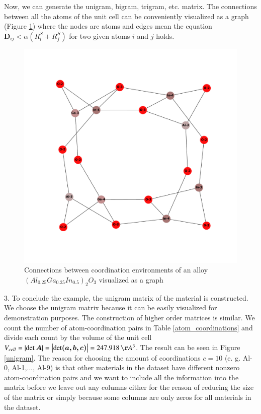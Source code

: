 \documentclass[11pt,oneside,czech,american]{book} %
\theoremstyle{plain}
\theoremstyle{definition}
\begin{document}
Now, we can generate the unigram, bigram, trigram, etc. matrix. The connections between all the atoms of the unit cell can be conveniently visualized as a graph (Figure \ref{graph}) where the nodes are atoms and edges mean the equation $\bm{D}_{ij} < \alpha(R^S_i + R^S_j)$ for two given atoms $i$ and $j$ holds.
\begin{figure}[H]
	\centering
	\includegraphics[scale=0.5]{id_20_graph.pdf}
	\caption{Connections between coordination environments of an alloy $(Al_{0.25}Ga_{0.25}In_{0.5})_2 O_3$ visualized as a graph \parencite{networkx}}
	\label{graph}
\end{figure}

3. To conclude the example, the unigram matrix of the material is constructed. We choose the unigram matrix because it can be easily visualized for demonstration purposes. The construction of higher order matrices is similar. We count the number of atom-coordination pairs in Table \ref{atom_coordinations} and divide each count by the volume of the unit cell $V_{cell} = \left| \det \bm{A} \right| = \left| \det \bm{(\bm{a}, \bm{b}, \bm{c})} \right| = 247.918 \, \AA^3$. The result can be seen in Figure \ref{unigram}. The reason for choosing the amount of coordinations $c = 10$ (e. g. Al-0, Al-1,..., Al-9) is that other materials in the dataset have different nonzero atom-coordination pairs and we want to include all the information into the matrix before we leave out any columns either for the reason of reducing the size of the matrix or simply because some columns are only zeros for all materials in the dataset.
\end{document}
